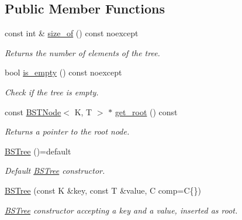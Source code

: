 \subsection*{Public Member Functions}
\begin{DoxyCompactItemize}
\item 
const int \& \hyperlink{class_b_s_tree_a176f1ccfb16c72f653d27c0a8a02fbb5}{size\+\_\+of} () const noexcept
\begin{DoxyCompactList}\small\item\em Returns the number of elements of the tree. \end{DoxyCompactList}\item 
bool \hyperlink{class_b_s_tree_a8002c1bc948d8ef1085fb53949562fc0}{is\+\_\+empty} () const noexcept
\begin{DoxyCompactList}\small\item\em Check if the tree is empty. \end{DoxyCompactList}\item 
const \hyperlink{class_node_namespace_1_1_b_s_t_node}{B\+S\+T\+Node}$<$ K, T $>$ $\ast$ \hyperlink{class_b_s_tree_add1b6b6c2b9b5a871d6ae06ba2ab174f}{get\+\_\+root} () const
\begin{DoxyCompactList}\small\item\em Returns a pointer to the root node. \end{DoxyCompactList}\item 
\mbox{\label{class_b_s_tree_a31f5f4929f634ab6eeeed262158a407f}} 
\hyperlink{class_b_s_tree_a31f5f4929f634ab6eeeed262158a407f}{B\+S\+Tree} ()=default
\begin{DoxyCompactList}\small\item\em Default \hyperlink{class_b_s_tree}{B\+S\+Tree} constructor. \end{DoxyCompactList}\item 
\mbox{\label{class_b_s_tree_a4c7cc79e77368b2196be5463ce51dabb}} 
\hyperlink{class_b_s_tree_a4c7cc79e77368b2196be5463ce51dabb}{B\+S\+Tree} (const K \&key, const T \&value, C comp=C\{\})
\begin{DoxyCompactList}\small\item\em \hyperlink{class_b_s_tree}{B\+S\+Tree} constructor accepting a key and a value, inserted as root. \end{DoxyCompactList}\item 
\mbox{\label{class_b_s_tree_aa688700e2b3298d2c59ecb505522daf2}} 

\end{DoxyCompactItemize}
